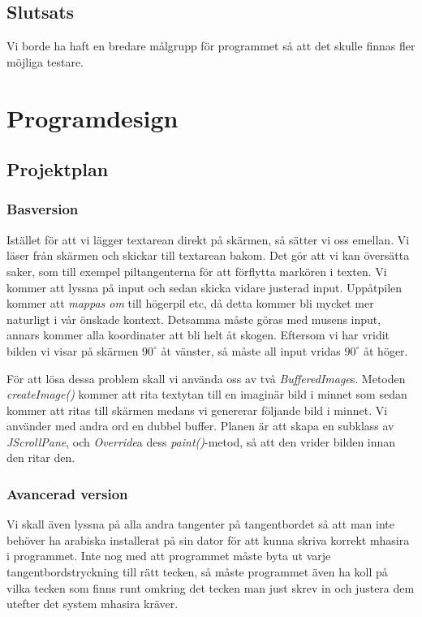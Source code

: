 \documentclass[a4paper,11p,twoside]{article}
\begin{document}
\subsection{Slutsats}
Vi borde ha haft en bredare målgrupp för programmet så att det skulle finnas fler möjliga testare.

\section{Programdesign}
\subsection{Projektplan}
\subsubsection{Basversion}
Istället för att vi lägger textarean direkt på skärmen, så sätter vi oss emellan. Vi läser från skärmen och skickar till textarean bakom.
Det gör att vi kan översätta saker, som till exempel piltangenterna för att förflytta markören i texten. Vi kommer att lyssna på input och sedan skicka vidare justerad input. Uppåtpilen kommer att \emph{mappas om} till högerpil etc, då detta kommer bli mycket mer naturligt i vår önskade kontext. Detsamma måste göras med musens input, annars kommer alla koordinater att bli helt åt skogen. Eftersom vi har vridit bilden vi visar på skärmen $90^\circ$ åt vänster, så måste all input vridas $90^\circ$ åt höger.

För att lösa dessa problem skall vi använda oss av två \emph{BufferedImage}s. Metoden \emph{createImage()} kommer att rita textytan till en imaginär bild i minnet som sedan kommer att ritas till skärmen medans vi genererar följande bild i minnet. Vi använder med andra ord en  dubbel buffer. Planen är att skapa en subklass av \emph{JScrollPane}, och \emph{Override}a dess \emph{paint()}-metod, så att den vrider bilden innan den ritar den. 

\subsubsection{Avancerad version}
Vi skall även lyssna på alla andra tangenter på tangentbordet så att man inte behöver ha arabiska installerat på sin dator för att kunna skriva korrekt mhasira i programmet. Inte nog med att programmet måste byta ut varje tangentbordstryckning till rätt tecken, så måste programmet även ha koll på vilka tecken som finns runt omkring det tecken man just skrev in och justera dem utefter det system mhasira kräver.
\end{document}
